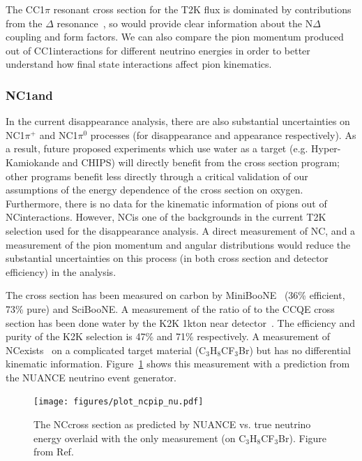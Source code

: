 The CC1$\pi$ resonant cross section for the T2K flux is dominated by contributions from the $\Delta$ resonance~\cite{Lalakulich:2013iaa}, so \nuprismlite would provide clear information about the N$\Delta$ coupling and form factors. We can also compare the pion momentum produced out of CC1\pip interactions for different neutrino energies in order to better understand how final state interactions affect pion kinematics.



\subsubsection{NC1\pip and \ncpi}


In the current disappearance analysis, there are also substantial uncertainties on NC1$\pi^+$ and NC1$\pi^0$ processes (for disappearance and appearance respectively). As a result, future proposed experiments which use water as a target (e.g. Hyper-Kamiokande and CHIPS) will directly benefit from the \nuprismlite cross section program; other programs benefit less directly through a critical validation of our assumptions of the energy dependence of the cross section on oxygen.
 Furthermore, there is no data for the kinematic information of pions out of NC\pip interactions. However, NC\pip is one of the backgrounds in the current T2K \rmu selection used for the disappearance analysis. A direct measurement of NC\pip, and a measurement of the pion momentum and angular distributions would reduce the substantial uncertainties on this process (in both cross section and detector efficiency) in the analysis.


The \ncpi  cross section has been measured on carbon by MiniBooNE~\cite{AguilarArevalo:2009ww} (36\% efficient, 73\% pure) and SciBooNE. A measurement of the ratio of \ncpi to the CCQE cross section has been done water by the K2K 1kton near detector~\cite{Nakayama:2004dp}. The efficiency and purity of the K2K selection is 47\% and 71\% respectively. A measurement of NC\pip exists~\cite{hawker} on a complicated target material (C$_3$H$_8$CF$_3$Br) but has no differential kinematic information. Figure~\ref{fig:ncpip} shows this measurement with a prediction from the NUANCE neutrino event generator.  

\begin{figure}[htpb]
\begin{center}
      \texttt{[image: figures/plot\_ncpip\_nu.pdf]}
\end{center}
\caption{The NC\pip  cross section as predicted by NUANCE vs. true neutrino energy overlaid with the only measurement (on C$_3$H$_8$CF$_3$Br). Figure from Ref.~\cite{Formaggio:2013kya}}
\label{fig:ncpip}
\end{figure}

